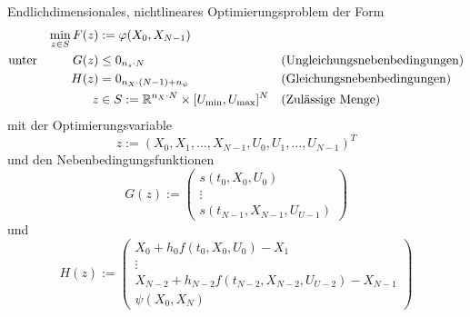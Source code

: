 \begin{problem}\label{prob:EndNichtOpt}
    Endlichdimensionales, nichtlineares Optimierungsproblem der Form
    \begin{align*}
        \min_{z \in S} F(z) &:= \varphi(X_0,X_{N-1}) & & \\
        \text{unter} \hspace{10mm} G(z) &\leq 0_{n_s \cdot N} & &  \text{(Ungleichungsnebenbedingungen)} \\
        H(z) &= 0_{n_X \cdot (N-1) + n_{\psi}} & & \text{(Gleichungsnebenbedingungen)}\\
        z &\in S := \R^{n_X \cdot N} \times [U_{\min},U_{\max}]^{N} & &  \text{(Zulässige Menge)}
    \end{align*}
    mit der Optimierungsvariable
    \begin{equation}
        z := (X_0,X_1,...,X_{N-1},U_0,U_1,...,U_{N-1})^T
    \end{equation}
    und den Nebenbedingungsfunktionen 
    \begin{equation}
        G(z) := 
        \begin{pmatrix}
            s(t_0,X_0,U_0) \\ 
            \vdots \\ 
            s(t_{N-1},X_{N-1},U_{U-1})
        \end{pmatrix} 
    \end{equation}
    und
    \begin{equation}
        H(z) := 
        \begin{pmatrix}
            X_0 + h_0 f(t_0,X_0,U_0) - X_1 \\ 
            \vdots \\ 
            X_{N-2} + h_{N-2} f(t_{N-2},X_{N-2},U_{U-2}) - X_{N-1} \\
            \psi(X_0,X_N)
        \end{pmatrix} 
    \end{equation}
\end{problem}



 








